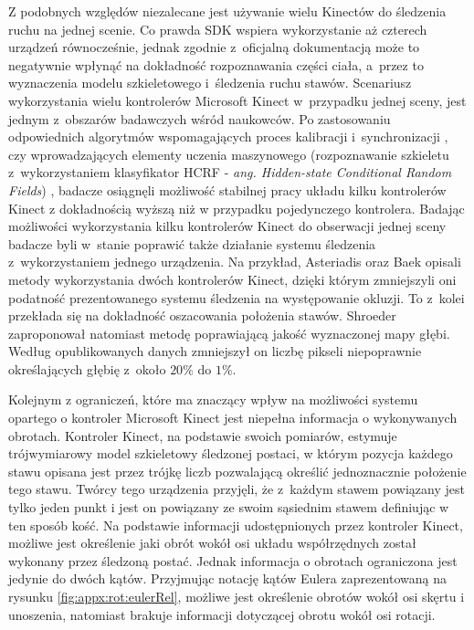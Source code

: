 Z podobnych względów niezalecane jest używanie wielu Kinectów do śledzenia ruchu na jednej scenie. Co prawda SDK wspiera wykorzystanie aż czterech urządzeń równocześnie, jednak zgodnie z~oficjalną dokumentacją może to negatywnie wpłynąć na dokładność rozpoznawania części ciała, a~przez to wyznaczenia modelu szkieletowego i~śledzenia ruchu stawów. Scenariusz wykorzystania wielu kontrolerów Microsoft Kinect w~przypadku jednej sceny, jest jednym z~obszarów badawczych wśród naukowców. Po zastosowaniu odpowiednich algorytmów wspomagających proces kalibracji i~synchronizacji \cite{Kohno2013}, czy wprowadzających elementy uczenia maszynowego (rozpoznawanie szkieletu z~wykorzystaniem klasyfikator HCRF - \emph{ang. Hidden-state Conditional Random Fields}) \cite{Kitsikidis2011}, badacze osiągnęli możliwość stabilnej pracy układu kilku kontrolerów Kinect z dokładnością wyższą niż w przypadku pojedynczego kontrolera. Badając możliwości wykorzystania kilku kontrolerów Kinect do obserwacji jednej sceny badacze byli w~stanie poprawić także działanie systemu śledzenia z~wykorzystaniem jednego urządzenia. Na przykład, Asteriadis \cite{Asteriadis2013} oraz Baek \cite{Baek2014} opisali metody wykorzystania dwóch kontrolerów Kinect, dzięki którym zmniejszyli oni podatność prezentowanego systemu śledzenia na występowanie okluzji. To z~kolei przekłada się na dokładność oszacowania położenia stawów. Shroeder \cite{Schroder2011} zaproponował natomiast metodę poprawiającą jakość wyznaczonej mapy głębi. Według opublikowanych danych zmniejszył on liczbę pikseli niepoprawnie określających głębię z~około $20\%$ do $1\%$.

Kolejnym z ograniczeń, które ma znaczący wpływ na możliwości systemu opartego o kontroler Microsoft Kinect jest niepełna informacja o wykonywanych obrotach. Kontroler Kinect, na podstawie swoich pomiarów, estymuje trójwymiarowy model szkieletowy śledzonej postaci, w którym pozycja każdego stawu opisana jest przez trójkę liczb pozwalającą określić jednoznacznie położenie tego stawu. Twórcy tego urządzenia przyjęli, że z~każdym stawem powiązany jest tylko jeden punkt i jest on powiązany ze swoim sąsiednim stawem definiując w ten sposób kość. Na podstawie informacji udostępnionych przez kontroler Kinect, możliwe jest określenie jaki obrót wokół osi układu współrzędnych został wykonany przez śledzoną postać. Jednak informacja o obrotach ograniczona jest jedynie do dwóch kątów. Przyjmując notację kątów Eulera zaprezentowaną na rysunku \ref{fig:appx:rot:eulerRel}, możliwe jest określenie obrotów wokół osi skęrtu i unoszenia, natomiast brakuje informacji dotyczącej obrotu wokół osi rotacji.

